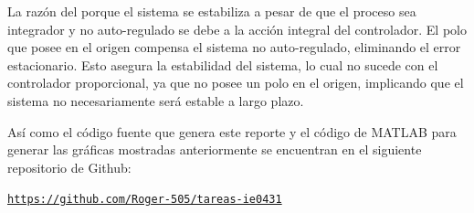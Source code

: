 La razón del porque el sistema se estabiliza a pesar de que el proceso sea integrador y no auto-regulado se debe a la acción integral del controlador. El polo que posee en el origen compensa el sistema no auto-regulado, eliminando el error estacionario. Esto asegura la estabilidad del sistema, lo cual no sucede con el controlador proporcional, ya que no posee un polo en el origen, implicando que el sistema no necesariamente será estable a largo plazo.

\vspace{1em}
\begin{mdframed}
        Así como el código fuente que genera este reporte y el código de MATLAB para generar las gráficas mostradas anteriormente se encuentran en el siguiente repositorio de Github:
    
    \begin{center}
        \href{https://github.com/Roger-505/tareas-ie0431}{\texttt{https://github.com/Roger-505/tareas-ie0431}}
    \end{center}
\end{mdframed}

